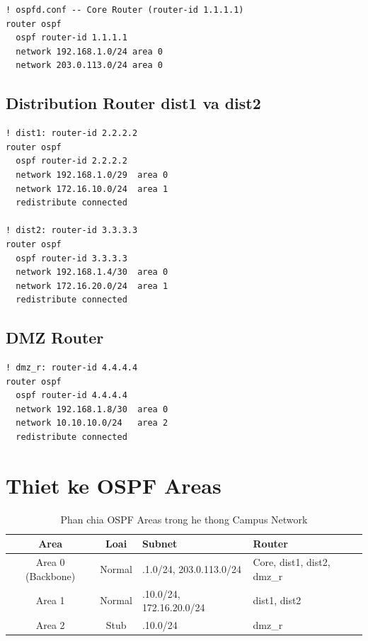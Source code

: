 \begin{lstlisting}
! ospfd.conf -- Core Router (router-id 1.1.1.1)
router ospf
  ospf router-id 1.1.1.1
  network 192.168.1.0/24 area 0
  network 203.0.113.0/24 area 0
\end{lstlisting}

\subsection{Distribution Router dist1 va dist2}

\begin{lstlisting}
! dist1: router-id 2.2.2.2
router ospf
  ospf router-id 2.2.2.2
  network 192.168.1.0/29  area 0
  network 172.16.10.0/24  area 1
  redistribute connected

! dist2: router-id 3.3.3.3
router ospf
  ospf router-id 3.3.3.3
  network 192.168.1.4/30  area 0
  network 172.16.20.0/24  area 1
  redistribute connected
\end{lstlisting}

\subsection{DMZ Router}

\begin{lstlisting}
! dmz_r: router-id 4.4.4.4
router ospf
  ospf router-id 4.4.4.4
  network 192.168.1.8/30  area 0
  network 10.10.10.0/24   area 2
  redistribute connected
\end{lstlisting}

\section{Thiet ke OSPF Areas}

\begin{table}[H]
\centering
\caption{Phan chia OSPF Areas trong he thong Campus Network}
\vspace{0.3cm}
\begin{tabularx}{\textwidth}{|c|c|>{\raggedright\arraybackslash}X|>{\raggedright\arraybackslash}X|}
    \hline
    \textbf{Area} & \textbf{Loai} & \textbf{Subnet} & \textbf{Router} \\ \hline
    Area 0 (Backbone) & Normal & 192.168.1.0/24, 203.0.113.0/24 & Core, dist1, dist2, dmz\_r \\ \hline
    Area 1 & Normal & 172.16.10.0/24, 172.16.20.0/24 & dist1, dist2 \\ \hline
    Area 2 & Stub & 10.10.10.0/24 & dmz\_r \\ \hline
\end{tabularx}
\label{tab:ospf_areas}
\end{table}

